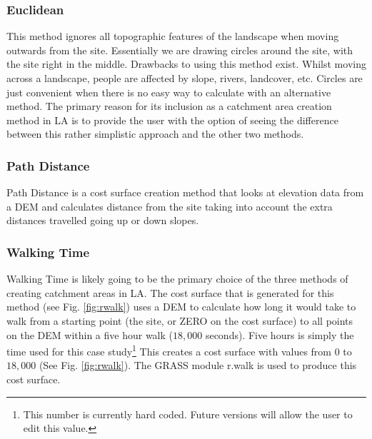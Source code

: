   \subsubsection{Euclidean} \label{subsection:Euclidean} 
  
  This method ignores all topographic features of the landscape when moving
  outwards from the site.  Essentially we are drawing circles around the site,
  with the site right in the middle.  Drawbacks to using this method exist.
  Whilst moving across a landscape, people are affected by slope, rivers,
  landcover, etc.  Circles are just convenient when there is no easy way to
  calculate with an alternative method.  The primary reason for its inclusion
  as a catchment area creation method in LA is to provide the user
  with the option of seeing the difference between this rather simplistic
  approach and the other two methods.

  \subsubsection{Path Distance}
  
  Path Distance is a cost surface creation method that looks at elevation data
  from a DEM and calculates distance from the site taking into account the
  extra distances travelled going up or down slopes.

  \subsubsection{Walking Time}
  
  Walking Time is likely going to be the primary choice of the three methods of
  creating catchment areas in LA.  The cost surface that is
  generated for this method (see Fig. \ref{fig:rwalk}) uses a DEM to calculate
  how long it would take to walk from a starting point (the site, or ZERO on
  the cost surface) to all points on the DEM within a five hour walk ($18,000$
  seconds). Five hours is simply the time used for this case
  study\footnote{This number is currently hard coded. Future versions will
  allow the user to edit this value.} This creates a cost surface with values
  from $0$ to $18,000$ (See Fig. \ref{fig:rwalk}).  The GRASS module r.walk is
  used to produce this cost surface.

